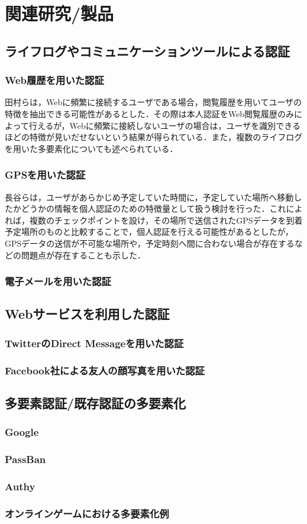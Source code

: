 \chapter{関連研究/製品}\label{chap:relatedwork}

\section{ライフログやコミュニケーションツールによる認証}

\subsection{Web履歴を用いた認証}
田村ら\cite{tamura:2011-07-14}は，Webに頻繁に接続するユーザである場合，閲覧履歴を用いてユーザの特徴を抽出できる可能性があるとした．その際は本人認証をWeb閲覧履歴のみによって行えるが，Webに頻繁に接続しないユーザの場合は，ユーザを識別できるほどの特徴が見いだせないという結果が得られている．また，複数のライフログを用いた多要素化についても述べられている．

\subsection{GPSを用いた認証}
長谷ら\cite{hase:2004-08-20}は，ユーザがあらかじめ予定していた時間に，予定していた場所へ移動したかどうかの情報を個人認証のための特徴量として扱う検討を行った．これによれば，複数のチェックポイントを設け，その場所で送信されたGPSデータを到着予定場所のものと比較することで，個人認証を行える可能性があるとしたが，GPSデータの送信が不可能な場所や，予定時刻へ間に合わない場合が存在するなどの問題点が存在することも示した．

\subsection{電子メールを用いた認証}
\section{Webサービスを利用した認証}
\subsection{TwitterのDirect Messageを用いた認証}
\subsection{Facebook社による友人の顔写真を用いた認証}
\section{多要素認証/既存認証の多要素化}\label{sec:multifactor}
\subsection{Google}
\subsection{PassBan}
\subsection{Authy}
\subsection{オンラインゲームにおける多要素化例}

\newpage
